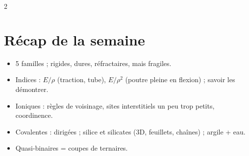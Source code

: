 \documentclass[a4paper,9pt]{extarticle}
\begin{document}
\begin{multicols}{2}
\section{Récap de la semaine}

\begin{recap}
\begin{itemize}
\item 5 familles ; rigides, dures, réfractaires, mais fragiles.
\item Indices : $E/\rho$ (traction, tube), $E/\rho^2$ (poutre pleine en flexion) ; savoir les
      démontrer.
\item Ioniques : règles de voisinage, sites interstitiels un peu trop petits, coordinence.
\item Covalentes : dirigées ; silice et silicates (3D, feuillets, chaînes) ; argile + eau.
\item Quasi-binaires = coupes de ternaires.
\end{itemize}
\end{recap}

\end{multicols}
\end{document}
